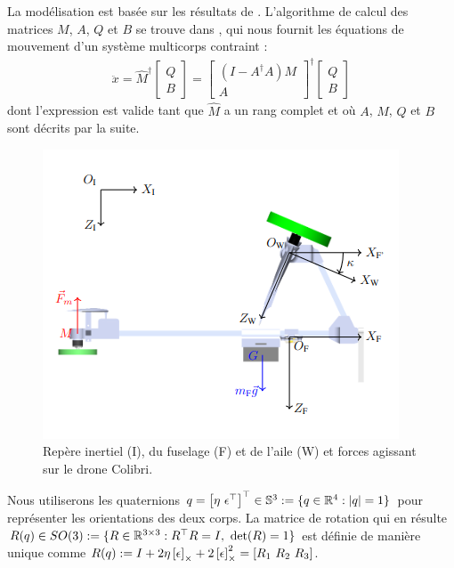 La modélisation est basée sur les résultats de \cite[Section 2.15]{udwadia-phohomsiri}. L'algorithme de calcul des matrices $M$, $A$, $Q$ et $B$ se trouve dans \cite{udwadia-schutte}, qui nous fournit les équations de mouvement d'un système multicorps contraint : 
\begin{align}
\label{eq:udwadia}
    \ddot{x} = \hat{M}^{\dag} \begin{bmatrix} Q \\ B \end{bmatrix}  = \begin{bmatrix} (I - A^{\dag}A)M \\ A \end{bmatrix}^{\dag} \begin{bmatrix} Q \\ B \end{bmatrix}
\end{align}
dont l'expression est valide tant que $\hat{M}$ a un rang complet et où $A$, $M$, $Q$ et $B$ sont décrits par la suite.

\begin{figure}[ht!]
    \centering
    \includegraphics[width=0.6\columnwidth,angle=0,trim={0 0 0 0.5cm},clip]{figures/fram_side_colibri.png}
    \caption{Repère inertiel (I), du fuselage (F) et de l'aile (W) et forces agissant sur le drone Colibri.}
    \label{fig:colibri_frame_side}
\end{figure}
Nous utiliserons les quaternions $q = \left[ \eta ~ \epsilon^\top \right]^\top  \in {\mathbb S}^3:=\{ q\in {\mathbb R}^4: |q| = 1\}$ pour représenter les orientations des deux corps. La matrice de rotation qui en résulte $R(q) \in SO(3): = \{R\in {\mathbb R}^{3\times 3}: R^\top R = I,~\det(R)=1\}$ est définie de manière unique comme $R(q) := I +2\eta \left[\epsilon\right]_{\times} + 2\left[\epsilon\right]_{\times}^{2} = [R_{1}~R_{2}~R_{3}]$.

